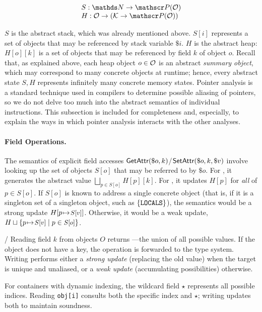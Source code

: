 \[
\begin{array}{@{}l@{}}
  S : \tN \to \powerset(\tO) \\
  H : \tO \to (\tK \to \powerset(\tO))
\end{array}
\]

$S$ is the abstract stack, which was already mentioned above.
$S[i]$ represents a set of objects that may be referenced
by stack variable $\$i$.
$H$ is the abstract heap: $H[o][k]$ is a set of objects that
may be referenced by field $k$ of object $o$.
Recall that, as explained above, each heap object $o\in\mathcal{O}$
is an abstract \emph{summary object}, which may correspond
to many concrete objects at runtime;
hence, every abstract state $S,H$ represents infinitely
many concrete memory states.
Pointer analysis is a standard technique used in compilers
to determine possible aliasing of pointers, so we do not
delve too much into the abstract semantics of individual
instructions.
This subsection is included for completeness and, especially,
to explain the ways in which pointer analysis interacts with
the other analyses.


\paragraph{Field Operations.}
The semantics of explicit field accesses 
$\textsf{GetAttr}(\$o, k)$/$\textsf{SetAttr}(\$o, k, \$v)$
involve looking up the set of objects $S[o]$ that may be
referred to by $\$o$.
For \tGetAttr, it generates the abstract value
$\bigsqcup_{p \in S[o]} H[p][k]$.
For \tSetAttr, it updates $H[p]$ for \emph{all} of $p\in S[o]$.
If $S[o]$ is known to address a single concrete object (that is, if it is a singleton set of a singleton object, such as
$\{\texttt{LOCALS}\}$),
the semantics would be a strong update
$H[p{\hspace{1pt}\mapsto\hspace{1pt}} \mbox{\small $S[v]$}]$.
Otherwise, it would be a weak update,
$H\sqcup\{p{\hspace{1pt}\mapsto\hspace{1pt}} \mbox{\small $S[v]$}\mid p\in \mbox{\small $S[o]$}\}$.

\tGetAttr/\tSetAttr
Reading field $k$ from objects $O$ returns ---the union of all possible values. If the object does not have a key, the operation is forwarded to the type system. Writing performs either a \emph{strong update} (replacing the old value) when the target is unique and unaliased, or a \emph{weak update} (accumulating possibilities) otherwise.

For containers with dynamic indexing, the wildcard field $\star$ represents all possible indices. Reading \texttt{obj[i]} consults both the specific index and $\star$; writing updates both to maintain soundness.

